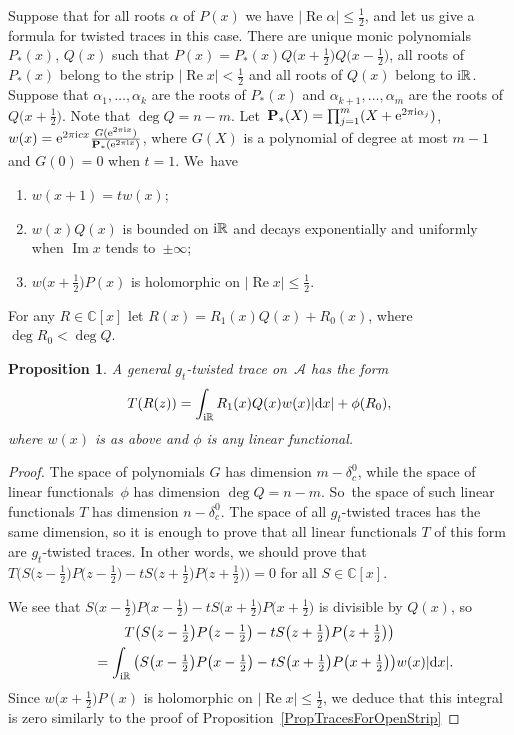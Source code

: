 \documentclass[10pt,a4paper]{amsart}
\newcommand{\RN}{\mathbb{R}} %
\newcommand{\CN}{\mathbb{C}} %
\renewcommand{\Im}{\mathop{\mathrm{Im}}\nolimits}
\newcommand{\mc}[1]{\mathcal{#1}}
\renewcommand{\Re}{\operatorname{Re}}
\newcommand{\bP}{\mathbf{P}}
\newtheorem{Proposition}[Theorem]{Proposition}
\theoremstyle{definition}
\numberwithin{equation}{section}
\begin{document}
Suppose that for all roots $\alpha$ of $P(x)$ we have $|\Re\alpha|\leq \frac{1}{2}$, and let us give a formula for twisted traces in this case.
 There are unique monic polynomials $P_*(x)$, $Q(x)$ such that $P(x)=P_*(x)Q\big(x+\frac{1}{2}\big)Q\big(x-\tfrac{1}{2}\big)$, all roots of $P_*(x)$ belong to the strip $|\Re x|<\frac{1}{2}$ and all roots of $Q(x)$ belong to ${\rm i}\RN$. Suppose that $\alpha_1,\ldots,\alpha_k$ are the roots of $P_*(x)$ and $\alpha_{k+1},\ldots,\alpha_m$ are the roots of~$Q\big(x+\frac{1}{2}\big)$. Note that $\deg Q=n-m$. Let~$\bP_*(X)=\prod_{j=1}^m(X+{\rm e}^{2\pi {\rm i}\alpha_j})$, $w(x)={\rm e}^{2\pi {\rm i}cx}\frac{G({\rm e}^{2\pi {\rm i} x})}{\bP_*({\rm e}^{2\pi {\rm i} x})}$, where $G(X)$ is a polynomial of degree at most $m-1$ and $G(0)=0$ when $t=1$. We~have
\begin{enumerate}\itemsep=0pt
\item[(1)]
$w(x+1)=tw(x)$;
\item[(2)]
$w(x)Q(x)$ is bounded on ${\rm i}\RN$ and decays exponentially and uniformly when $\Im x$ tends to~$\pm \infty$;
\item[(3)]
$w\big(x+\frac{1}{2}\big)P(x)$ is holomorphic on $|\Re x|\leq \frac{1}{2}$.
\end{enumerate}
For any $R\in \CN[x]$ let $R(x)=R_1(x)Q(x)+R_0(x)$, where $\deg R_0<\deg Q$.
\begin{Proposition}
\label{PropTracesForClosedStrip}
A general $g_t$-twisted trace on~$\mc A$
has the form
\[T(R(z))=\int_{{\rm i}\RN}R_1(x)Q(x)w(x)|{\rm d}x|+\phi(R_0),\] where $w(x)$ is as above and $\phi$ is any linear functional.
\end{Proposition}
\begin{proof}
The space of polynomials $G$ has dimension $m-\delta_c^0$, while the space of linear functionals~$\phi$ has dimension $\deg Q=n-m$. So~the space of such linear functionals $T$ has dimension $n-\delta_c^0$. The space of all $g_t$-twisted traces has the same dimension, so it is enough to prove that all linear functionals $T$ of this form are $g_t$-twisted traces. In other words, we should prove that $T\big(S\big(z-\frac{1}{2}\big)P\big(z-\frac{1}{2}\big)-tS\big(z+\frac{1}{2}\big)P\big(z+\frac{1}{2}\big)\big)=0$ for all $S\in\CN[x]$.

We see that $S\big(x-\tfrac{1}{2}\big)P\big(x-\tfrac{1}{2}\big)-tS\big(x+\frac{1}{2}\big)P\big(x+\frac{1}{2}\big)$ is divisible by $Q(x)$, so
\begin{gather*}
T\big(S\big(z-\tfrac{1}{2}\big)P\big(z-\tfrac{1}{2}\big)-tS\big(z+\tfrac{1}{2}\big)
P\big(z+\tfrac{1}{2}\big)\big)
\\ \qquad
{}= \int_{{\rm i}\RN}\big(S\big(x-\tfrac{1}{2}\big)P\big(x-\tfrac{1}{2}\big)-tS\big(x+\tfrac{1}{2}\big)
P\big(x+\tfrac{1}{2}\big)\big)w(x)|{\rm d}x|.
\end{gather*}
Since $w\big(x+\frac{1}{2}\big)P(x)$ is holomorphic on $|\Re x|\leq \frac{1}{2}$, we deduce that this integral is zero similarly to the proof of Proposition~\ref{PropTracesForOpenStrip}
\end{proof}
\end{document}
